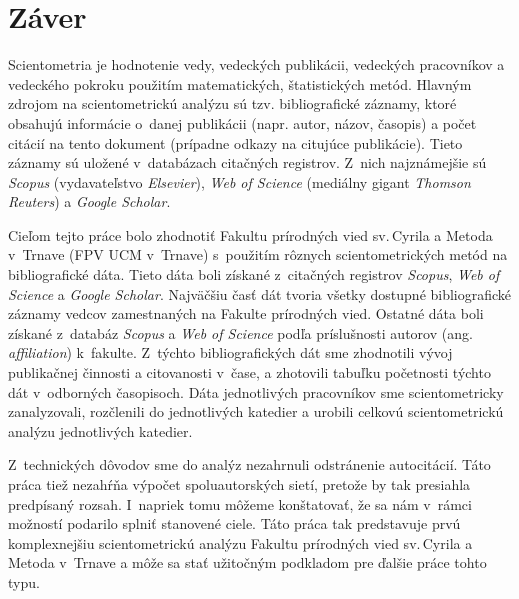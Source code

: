 \chapter*{Záver}

Scientometria je hodnotenie vedy, vedeckých publikácii, vedeckých pracovníkov a
vedeckého pokroku použitím matematických, štatistických metód. Hlavným zdrojom
na scientometrickú analýzu sú tzv. bibliografické záznamy, ktoré obsahujú
informácie o~danej publikácii (napr. autor, názov, časopis) a počet citácií na
tento dokument (prípadne odkazy na citujúce publikácie). Tieto záznamy sú
uložené v~databázach citačných registrov. Z~nich najznámejšie sú \emph{Scopus}
(vydavateľstvo \emph{Elsevier}), \emph{Web of Science} (mediálny gigant
\emph{Thomson Reuters}) a \emph{Google Scholar}.

Cieľom tejto práce bolo zhodnotiť Fakultu prírodných vied sv.\,Cyrila a Metoda
v~Trnave (FPV UCM v~Trnave) s~použitím rôznych scientometrických metód na
bibliografické dáta.  Tieto dáta boli získané z~citačných registrov
\emph{Scopus}, \emph{Web of Science} a \emph{Google Scholar}. Najväčšiu časť dát
tvoria všetky dostupné bibliografické záznamy vedcov zamestnaných na Fakulte
prírodných vied.  Ostatné dáta boli získané z~databáz \emph{Scopus} a \emph{Web
  of Science} podľa príslušnosti autorov (ang.  \emph{affiliation})
k~fakulte. Z~týchto bibliografických dát sme zhodnotili vývoj publikačnej
činnosti a citovanosti v~čase, a zhotovili tabuľku početnosti týchto dát
v~odborných časopisoch. Dáta jednotlivých pracovníkov sme scientometricky
zanalyzovali, rozčlenili do jednotlivých katedier a urobili celkovú
scientometrickú analýzu jednotlivých katedier.

Z~technických dôvodov sme do analýz nezahrnuli odstránenie autocitácií. Táto
práca tiež nezahŕňa výpočet spoluautorských sietí, pretože by tak presiahla
predpísaný rozsah.  I~napriek tomu môžeme konštatovať, že sa nám v~rámci
možností podarilo splniť stanovené ciele. Táto práca tak predstavuje prvú
komplexnejšiu scientometrickú analýzu Fakultu prírodných vied sv.\,Cyrila a
Metoda v~Trnave a môže sa stať užitočným podkladom pre ďalšie práce tohto typu.

